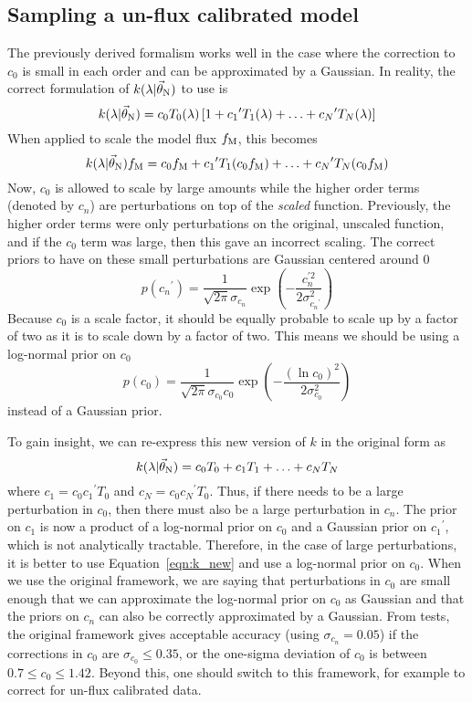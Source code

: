 \documentclass[preprint]{aastex} %
\newcommand{\vt}{\vec{\theta}}
\newcommand{\vN}{\vt_{\rm N}}
\newcommand{\fM}{f_{\rm M}}
\begin{document}
\subsection{Sampling a un-flux calibrated model}
The previously derived formalism works well in the case where the correction to $c_0$ is small in each order and can be approximated by a Gaussian. In reality, the correct formulation of $k(\lambda | \vN)$ to use is 
\begin{equation}
  k(\lambda | \vN) = c_0 T_0(\lambda) \left [1 + {c_1}^\prime T_1(\lambda) + \ldots + {c_N}^\prime T_N(\lambda) \right ]
  \label{eqn:k_new}
\end{equation}
When applied to scale the model flux $\fM$, this becomes
\begin{equation}
  k(\lambda | \vN) \fM = c_0 \fM + {c_1}^\prime T_1 (c_0 \fM) + \ldots + {c_N}^\prime T_N (c_0 \fM)
\end{equation}
Now, $c_0$ is allowed to scale by large amounts while the higher order terms (denoted by $c_n$) are perturbations on top of the \emph{scaled} function. Previously, the higher order terms were only perturbations on the original, unscaled function, and if the $c_0$ term was large, then this gave an incorrect scaling. The correct priors to have on these small perturbations are Gaussian centered around 0
\begin{equation}
  p({c_n}^\prime) = \frac{1}{\sqrt{2 \pi} \sigma_{c_n}} \exp \left( - \frac{c_n^{\prime 2}}{2 \sigma_{ {c_n}^\prime}^2} \right)
\end{equation}
Because $c_0$ is a scale factor, it should be equally probable to scale up by a factor of two as it is to scale down by a factor of two. This means we should be using a log-normal prior on $c_0$
\begin{equation}
  p(c_0) = \frac{1}{\sqrt{2 \pi} \sigma_{c_0} c_0} \exp \left( -\frac{(\ln c_0)^2}{2 \sigma_{c_0}^2} \right) 
\end{equation}
instead of a Gaussian prior. 

To gain insight, we can re-express this new version of $k$ in the original form as 
\begin{equation}
   k(\lambda | \vN) = c_0 T_0 + c_1 T_1 + \ldots + c_N T_N
\end{equation}
where $c_1 = c_0 {c_1}^\prime T_0$ and $c_N = c_0 {c_N}^\prime T_0$. Thus, if there needs to be a large perturbation in $c_0$, then there must also be a large perturbation in $c_n$. The prior on $c_1$ is now a product of a log-normal prior on $c_0$ and a Gaussian prior on ${c_1}^\prime$, which is not analytically tractable. Therefore, in the case of large perturbations, it is better to use Equation~\ref{eqn:k_new} and use a log-normal prior on $c_0$. When we use the original framework, we are saying that perturbations in $c_0$ are small enough that we can approximate the log-normal prior on $c_0$ as Gaussian and that the priors on $c_n$ can also be correctly approximated by a Gaussian. From tests, the original framework gives acceptable accuracy (using $\sigma_{c_n} = 0.05$) if the corrections in $c_0$ are $\sigma_{c_0} \leq 0.35$, or the one-sigma deviation of $c_0$ is between $0.7 \leq c_0 \leq 1.42$. Beyond this, one should switch to this framework, for example to correct for un-flux calibrated data.
\end{document}
